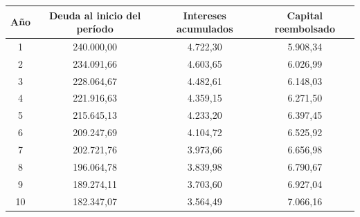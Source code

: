 \documentclass[a4paper,]{article}
\begin{document}
\begin{table}[h!]
\centering
\begin{tabular}{|
>{\columncolor[HTML]{EFEFEF}}c |c|c|c|}
\hline
\cellcolor[HTML]{C0C0C0}Año & \cellcolor[HTML]{C0C0C0}Deuda al inicio del período & \cellcolor[HTML]{C0C0C0}Intereses acumulados & \cellcolor[HTML]{C0C0C0}Capital reembolsado \\ \hline
1                           & 240.000,00                                          & 4.722,30                                     & 5.908,34                                    \\ \hline
2                           & 234.091,66                                          & 4.603,65                                     & 6.026,99                                    \\ \hline
3                           & 228.064,67                                          & 4.482,61                                     & 6.148,03                                    \\ \hline
4                           & 221.916,63                                          & 4.359,15                                     & 6.271,50                                    \\ \hline
5                           & 215.645,13                                          & 4.233,20                                     & 6.397,45                                    \\ \hline
6                           & 209.247,69                                          & 4.104,72                                     & 6.525,92                                    \\ \hline
7                           & 202.721,76                                          & 3.973,66                                     & 6.656,98                                    \\ \hline
8                           & 196.064,78                                          & 3.839,98                                     & 6.790,67                                    \\ \hline
9                           & 189.274,11                                          & 3.703,60                                     & 6.927,04                                    \\ \hline
10                          & 182.347,07                                          & 3.564,49                                     & 7.066,16                                    \\ \hline

\end{tabular}
\end{table}
\end{document}

